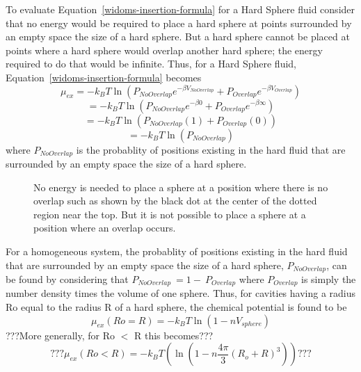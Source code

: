 \documentclass[12pt]{article}
\begin{document}
\noindent To evaluate Equation~\ref{widoms-insertion-formula} for a Hard Sphere fluid consider that
no energy would be required to place a hard sphere at points surrounded by an empty space the size of a hard sphere. 
But a hard sphere cannot be placed at points where a hard sphere would overlap another hard sphere; 
the energy required to do that would be infinite. Thus, for a Hard Sphere fluid, Equation~\ref{widoms-insertion-formula} becomes
\begin{equation}\mu_{ex}=-k_BT\ln\left(P_{NoOverlap}e^{-\beta{V}_{NoOverlap}}+P_{Overlap}e^{-\beta{V}_{Overlap}}\right)\end{equation}
\begin{equation}=-k_BT\ln\left(P_{NoOverlap}e^{-\beta{0}}+P_{Overlap}e^{-\beta\infty}\right)\end{equation}
\begin{equation}=-k_BT\ln\left(P_{NoOverlap}(1)+P_{Overlap}(0)\right)\end{equation}
\begin{equation}=-k_BT\ln\left(P_{NoOverlap}\right)\end{equation}
where $P_{NoOverlap}$ is the probablity of positions existing in the hard fluid that are surrounded by an empty space the size of a hard sphere.

\begin{figure}[h!]
    \centering
    \caption{No energy is needed to place a sphere at a position where there is no overlap such 
             as shown by the black dot at the center of the dotted region near the top. 
             But it is not possible to place a sphere at a position where an overlap occurs.}
    \label{fig:p_overlap}
  \end{figure}

For a homogeneous system, the probablity of positions existing in the hard fluid that are surrounded 
by an empty space the size of a hard sphere, $P_{NoOverlap}$, can be found by considering 
that $P_{NoOverlap}~=1-~P_{Overlap}$ where $P_{Overlap}$ is simply the number density times the volume of one sphere. 
\color{red}Thus, for cavities having a radius Ro equal to the radius R of a hard sphere, the chemical potential is found to be \color{black}
\begin{equation}\mu_{ex}(Ro=R)=-k_BT\ln\left(1-nV_{sphere}\right)\end{equation}
\color{red} ???More generally, for Ro $<$ R this becomes???
\begin{equation}???\mu_{ex}(Ro < R)=-k_BT(\ln(1-n\frac{4\pi}{3}(R_o+R)^3))???\end{equation}
\color{black}
\end{document}
